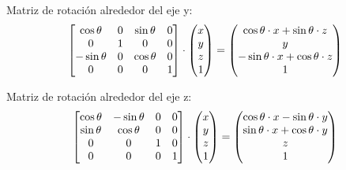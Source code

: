 Matriz de rotación alrededor del eje y:
\begin{align*}
    \begin{bmatrix}
        \cos{\theta} & 0 & \sin{\theta} & 0 \\
        0 & 1 & 0 & 0 \\
        -\sin{\theta} & 0 & \cos{\theta} & 0 \\
        0 & 0 & 0 & 1 \\
    \end{bmatrix} \cdot
    \begin{pmatrix} x \\ y \\ z \\ 1 \end{pmatrix} = 
    \begin{pmatrix} \cos{\theta} \cdot x + \sin{\theta} \cdot z \\
                    y \\
                    -\sin{\theta} \cdot x + \cos{\theta} \cdot z \\ 
                    1\end{pmatrix}
\end{align*}

Matriz de rotación alrededor del eje z:
\begin{align*}
    \begin{bmatrix}
        \cos{\theta} & -\sin{\theta} & 0 & 0 \\
        \sin{\theta} & \cos{\theta} & 0 & 0 \\
        0 & 0 & 1 & 0 \\
        0 & 0 & 0 & 1 \\
    \end{bmatrix} \cdot 
    \begin{pmatrix} x \\ y \\ z \\ 1 \end{pmatrix} = \begin{pmatrix} \cos{\theta} \cdot x - \sin{\theta} \cdot y \\
                    \sin{\theta} \cdot x + \cos{\theta} \cdot y \\
                    z \\ 1\end{pmatrix}
\end{align*}

